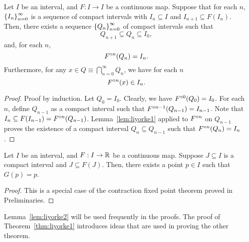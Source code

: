 \documentclass[12pt,draft,twoside]{book}
\begin{document}
\begin{lemma}
  Let $I$ be an interval, and $F: I\to I$ be a continuous map.
  Suppose that for each $n$, $\left \{ I_n \right \}^{\infty}_{n=0}$ is a sequence of compact intervals with $I_n \subseteq I$ and $I_{n+1} \subseteq F(I_n)$.
  Then, there exists a sequence $\left \{ Q_n \right \}^{\infty}_{n=0}$ of compact intervals such that 
  \begin{equation*}
    Q_{n+1} \subseteq Q_{n} \subseteq I_0,
  \end{equation*}
and, for each $n$,
  \begin{equation*}
    F^{\circ n}(Q_n) = I_n.
  \end{equation*}
  Furthermore, for any $x \in Q \equiv \bigcap\limits_{n=0}^{\infty}Q_n$, we have for each $n$
  \begin{equation*}
    F^{\circ n}(x) \in I_n.
  \end{equation*}
  \label{lem:liyorke2}
  \begin{proof}
    Proof by induction.
    Let $Q_0 = I_0$.
    Clearly, we have $F^{\circ 0}(Q_0) = I_0$.
    For each $n$, define $Q_{n-1}$ as a compact interval such that $F^{\circ n-1}(Q_{n-1}) = I_{n-1}$.
    Note that $I_n \subseteq F(I_{n-1}) = F^{\circ n}(Q_{n-1})$.
    Lemma~\ref{lem:liyorke1} applied to $F^{\circ n}$ on $Q_{n-1}$ proves the existence of a compact interval $Q_n \subseteq Q_{n-1}$ such that $F^{\circ n}(Q_n) = I_n$.
  \end{proof}
\end{lemma}

\begin{lemma}
  Let $I$ be an interval, and $F: I\to \mathbb{R}$ be a continuous map.
  Suppose $J \subseteq I$ is a compact interval and $J \subseteq F(J)$. 
  Then, there exists a point $p \in I$ such that $G(p) = p$.
  \begin{proof}
    This is a special case of the contraction fixed point theorem proved in Preliminaries.
  \end{proof}
  \label{lem:liyorke3}
\end{lemma}

Lemma~\ref{lem:liyorke2} will be used frequently in the proofs.
The proof of Theorem~\ref{thm:liyorke1} introduces ideas that are used in proving the other theorem.
\end{document}
